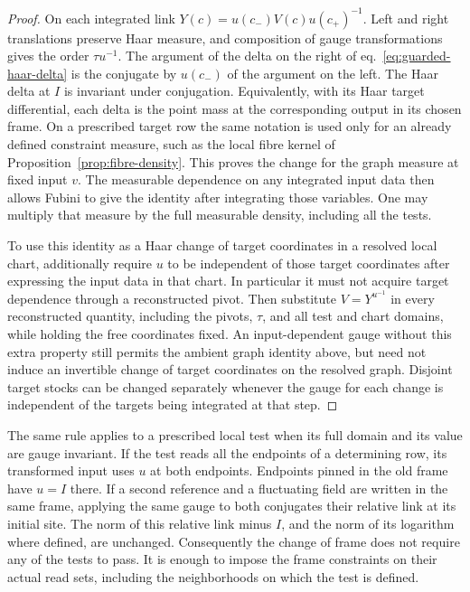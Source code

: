\documentclass[11pt,letterpaper,reqno]{amsart}
\numberwithin{equation}{section}
\renewcommand{\eqref}[1]{\textup{eq.~\ref{#1}}}
\theoremstyle{definition}
\theoremstyle{remark}
\begin{document}
\begin{proof}
On each integrated link \(Y(c)=u(c_-)V(c)u(c_+)^{-1}\).
Left and right translations preserve Haar measure, and composition
of gauge transformations gives the order \(\tau u^{-1}\).
The argument of the delta on the right of
\eqref{eq:guarded-haar-delta} is the conjugate by \(u(c_-)\)
of the argument on the left. The Haar delta at \(I\) is invariant
under conjugation. Equivalently, with its Haar target differential,
each delta is the point mass at the corresponding output in its
chosen frame. On a prescribed target row the same notation is used
only for an already defined constraint measure, such as the local
fibre kernel of Proposition~\ref{prop:fibre-density}.
This proves the change for the graph measure at fixed input \(v\).
The measurable dependence on any integrated input data then allows
Fubini to give the identity after integrating those variables.
One may multiply that measure by the full measurable density,
including all the tests.

To use this identity as a Haar change of target coordinates in a
resolved local chart, additionally require \(u\) to be independent
of those target coordinates after expressing the input data in that
chart. In particular it must not acquire target dependence through
a reconstructed pivot. Then substitute \(V=Y^{u^{-1}}\) in every
reconstructed quantity, including the pivots, \(\tau\), and all
test and chart domains, while holding the free coordinates fixed.
An input-dependent gauge without this extra property still permits
the ambient graph identity above, but need not induce an invertible
change of target coordinates on the resolved graph. Disjoint target
stocks can be changed separately whenever the gauge for each change
is independent of the targets being integrated at that step.
\end{proof}

The same rule applies to a prescribed local test when its full
domain and its value are gauge invariant. If the test reads all
the endpoints of a determining row, its transformed input uses
\(u\) at both endpoints. Endpoints pinned in the old frame have
\(u=I\) there. If a second reference and a fluctuating field are
written in the same frame, applying the same gauge to both
conjugates their relative link at its initial site. The norm of
this relative link minus \(I\), and the norm of its logarithm
where defined, are unchanged. Consequently the change of frame
does not require any of the tests to pass. It is enough to impose
the frame constraints on their actual read sets, including the
neighborhoods on which the test is defined.
\end{document}
